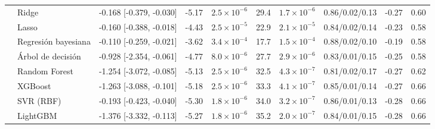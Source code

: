 \begin{longtable}{llcccccccc}
 & Ridge & -0.168 [-0.379, -0.030] & -5.17 & $2.5\times10^{-6}$ & 29.4 & $1.7\times10^{-6}$ & 0.86/0.02/0.13 & -0.27 & 0.60 \\
 & Lasso & -0.160 [-0.388, -0.018] & -4.43 & $2.5\times10^{-5}$ & 22.9 & $2.1\times10^{-5}$ & 0.84/0.02/0.14 & -0.23 & 0.58 \\
 & Regresión bayesiana & -0.110 [-0.259, -0.021] & -3.62 & $3.4\times10^{-4}$ & 17.7 & $1.5\times10^{-4}$ & 0.88/0.02/0.10 & -0.19 & 0.58 \\
 & Árbol de decisión & -0.928 [-2.354, -0.061] & -4.77 & $8.0\times10^{-6}$ & 27.7 & $2.9\times10^{-6}$ & 0.83/0.01/0.15 & -0.25 & 0.58 \\
 & Random Forest & -1.254 [-3.072, -0.085] & -5.13 & $2.5\times10^{-6}$ & 32.5 & $4.3\times10^{-7}$ & 0.81/0.02/0.17 & -0.27 & 0.62 \\
 & XGBoost & -1.263 [-3.088, -0.101] & -5.18 & $2.5\times10^{-6}$ & 33.3 & $4.1\times10^{-7}$ & 0.85/0.01/0.14 & -0.27 & 0.66 \\
 & SVR (RBF) & -0.193 [-0.423, -0.040] & -5.30 & $1.8\times10^{-6}$ & 34.0 & $3.2\times10^{-7}$ & 0.86/0.01/0.13 & -0.28 & 0.66 \\
 & LightGBM & -1.376 [-3.332, -0.113] & -5.27 & $1.8\times10^{-6}$ & 35.2 & $2.0\times10^{-7}$ & 0.84/0.01/0.15 & -0.28 & 0.66 \\
\end{longtable}